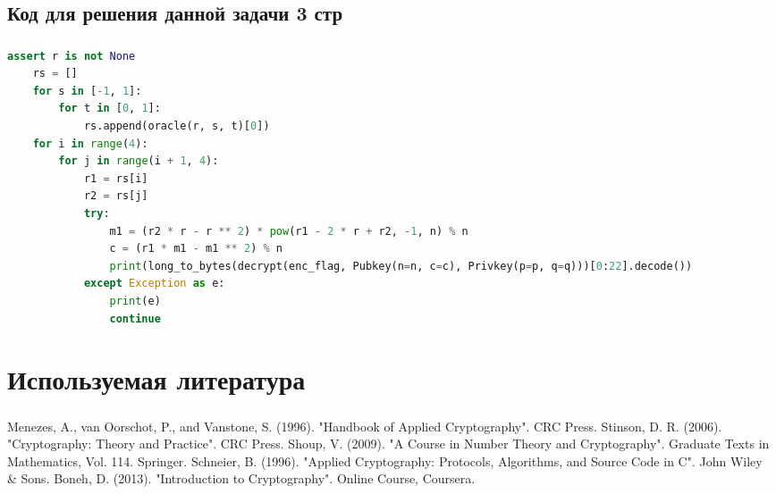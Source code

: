 \documentclass[t]{beamer}
\begin{document}
\subsection{Код для решения данной задачи 3 стр}
\begin{frame}[fragile]
\frametitle{\insertsection} 
\framesubtitle{\insertsubsection}
\footnotesize
\smaller
\begin{lstlisting}[language=Python]
    assert r is not None
    rs = []
    for s in [-1, 1]:
        for t in [0, 1]:
            rs.append(oracle(r, s, t)[0])
    for i in range(4):
        for j in range(i + 1, 4):
            r1 = rs[i]
            r2 = rs[j]
            try:
                m1 = (r2 * r - r ** 2) * pow(r1 - 2 * r + r2, -1, n) % n
                c = (r1 * m1 - m1 ** 2) % n
                print(long_to_bytes(decrypt(enc_flag, Pubkey(n=n, c=c), Privkey(p=p, q=q)))[0:22].decode())
            except Exception as e:
                print(e)
                continue
\end{lstlisting}	
\end{frame}

\section{Используемая литература}

\begin{frame}
    \frametitle{\insertsection}
    \begin{thebibliography}{1}
    Menezes, A., van Oorschot, P., and Vanstone, S. (1996). "Handbook of Applied Cryptography". CRC Press.\newline
    Stinson, D. R. (2006). "Cryptography: Theory and Practice". CRC Press. \newline 
    Shoup, V. (2009). "A Course in Number Theory and Cryptography". Graduate Texts in Mathematics, Vol. 114. Springer.
    Schneier, B. (1996). "Applied Cryptography: Protocols, Algorithms, and Source Code in C". John Wiley \& Sons.\newline
    Boneh, D. (2013). "Introduction to Cryptography". Online Course, Coursera.
    \end{thebibliography}
\end{frame}
\end{document}
